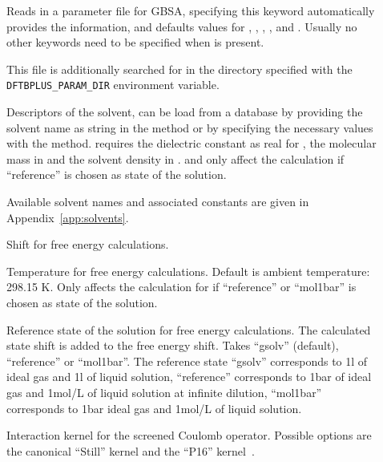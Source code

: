 \begin{description}
  \item[] Reads in a parameter file for GBSA, specifying this
    keyword automatically provides the  information, and defaults
    values for , , , 
    ,  and .
    Usually no other keywords need to be specified when  is present.

    This file is additionally searched for in the directory specified with the
    \texttt{DFTBPLUS\_PARAM\_DIR} environment variable.

  \item[] Descriptors of the solvent, can be load from a database
    by providing the solvent name as string in the  method or
    by specifying the necessary values with the  method.
     requires the dielectric constant as real for ,
    the molecular mass in   and the
    solvent density in  .
     and  only affect the calculation if
    ``reference'' is chosen as state of the solution.

    Available solvent names and associated constants are given in Appendix~\ref{app:solvents}.

  \item[]  Shift for free energy
    calculations.

  \item[] Temperature for free energy calculations. Default is
    ambient temperature: 298.15 K.
    Only affects the calculation for if ``reference'' or ``mol1bar'' is chosen
    as state of the solution.

  \item[] 
    Reference state of the solution for free energy calculations.
    The calculated state shift is added to the free energy shift.
    Takes ``gsolv'' (default), ``reference'' or ``mol1bar''.
    The reference state ``gsolv'' corresponds to 1\;l of ideal gas and 1\;l of
    liquid  solution,
    ``reference'' corresponds to 1\;bar of ideal gas and 1\;mol/L of liquid
    solution at infinite dilution,
    ``mol1bar'' corresponds to 1\;bar ideal gas and 1\;mol/L of liquid solution.

  \item[]
    Interaction kernel for the screened Coulomb operator.
    Possible options are the canonical ``Still'' kernel\cite{still1990} and the
    ``P16'' kernel~\cite{lange2012}.


\end{description}
